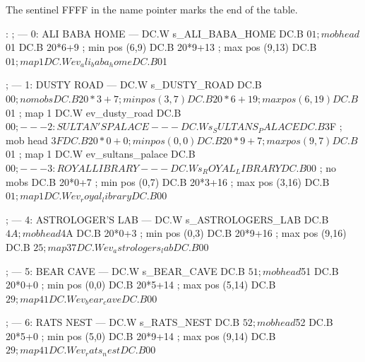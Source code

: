 \documentclass[10pt]{report}
\begin{document}
The sentinel {\Tt{}FFFF\nwendquote} in the name pointer marks the end of the table.

\nwenddocs{}\endmoddef\nwstartdeflinemarkup\nwenddeflinemarkup
{}:
    ; --- 0: ALI BABA HOME ---
    DC.W s_ALI_BABA_HOME
    DC.B $01                     ; mob head $01
    DC.B 20*6+9                  ; min pos (6,9)
    DC.B 20*9+13                 ; max pos (9,13)
    DC.B $01                     ; map 1
    DC.W ev_ali_baba_home
    DC.B $01

    ; --- 1: DUSTY ROAD ---
    DC.W s_DUSTY_ROAD
    DC.B $00                     ; no mobs
    DC.B 20*3+7                  ; min pos (3,7)
    DC.B 20*6+19                 ; max pos (6,19)
    DC.B $01                     ; map 1
    DC.W ev_dusty_road
    DC.B $00

    ; --- 2: SULTAN'S PALACE ---
    DC.W s_SULTANS_PALACE
    DC.B $3F                     ; mob head $3F
    DC.B 20*0+0                  ; min pos (0,0)
    DC.B 20*9+7                  ; max pos (9,7)
    DC.B $01                     ; map 1
    DC.W ev_sultans_palace
    DC.B $00

    ; --- 3: ROYAL LIBRARY ---
    DC.W s_ROYAL_LIBRARY
    DC.B $00                     ; no mobs
    DC.B 20*0+7                  ; min pos (0,7)
    DC.B 20*3+16                 ; max pos (3,16)
    DC.B $01                     ; map 1
    DC.W ev_royal_library
    DC.B $00

    ; --- 4: ASTROLOGER'S LAB ---
    DC.W s_ASTROLOGERS_LAB
    DC.B $4A                     ; mob head $4A
    DC.B 20*0+3                  ; min pos (0,3)
    DC.B 20*9+16                 ; max pos (9,16)
    DC.B $25                     ; map 37
    DC.W ev_astrologers_lab
    DC.B $00

    ; --- 5: BEAR CAVE ---
    DC.W s_BEAR_CAVE
    DC.B $51                     ; mob head $51
    DC.B 20*0+0                  ; min pos (0,0)
    DC.B 20*5+14                 ; max pos (5,14)
    DC.B $29                     ; map 41
    DC.W ev_bear_cave
    DC.B $00

    ; --- 6: RATS NEST ---
    DC.W s_RATS_NEST
    DC.B $52                     ; mob head $52
    DC.B 20*5+0                  ; min pos (5,0)
    DC.B 20*9+14                 ; max pos (9,14)
    DC.B $29                     ; map 41
    DC.W ev_rats_nest
    DC.B $00
\end{document}
